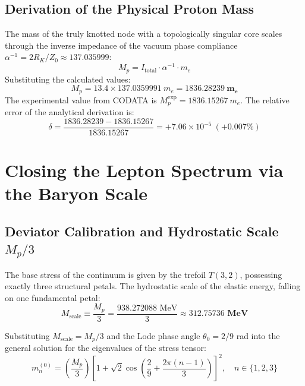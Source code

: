 \documentclass[12pt,a4paper]{article}
\begin{document}
	\subsection{Derivation of the Physical Proton Mass}
	The mass of the truly knotted node with a topologically singular core scales through the inverse impedance of the vacuum phase compliance $\alpha^{-1} = 2R_K / Z_0 \approx 137.035999$:
	\begin{equation}
		M_p = I_{\text{total}} \cdot \alpha^{-1} \cdot m_e
	\end{equation}
	Substituting the calculated values:
	\begin{equation}
		M_p = 13.4 \times 137.0359991 \ m_e = \mathbf{1836.28239 \ m_e}
	\end{equation}
	The experimental value from CODATA is $M_p^{\text{exp}} = 1836.15267 \ m_e$. 
	The relative error of the analytical derivation is:
	\begin{equation}
		\delta = \frac{1836.28239 - 1836.15267}{1836.15267} = +7.06 \times 10^{-5} \ (+0.007\%)
	\end{equation}
	
	\section{Closing the Lepton Spectrum via the Baryon Scale}
	
	\subsection{Deviator Calibration and Hydrostatic Scale $M_p/3$}
	The base stress of the continuum is given by the trefoil $T(3,2)$, possessing exactly three structural petals. The hydrostatic scale of the elastic energy, falling on one fundamental petal:
	\begin{equation}
		M_{\text{scale}} \equiv \frac{M_p}{3} = \frac{938.272088 \text{ MeV}}{3} \approx \mathbf{312.75736 \text{ MeV}}
	\end{equation}
	
	Substituting $M_{\text{scale}} = M_p/3$ and the Lode phase angle $\theta_0 = 2/9$ rad into the general solution for the eigenvalues of the stress tensor:
	\begin{equation}
		m_n^{(0)} = \left( \frac{M_p}{3} \right) \left[ 1 + \sqrt{2} \cos\left( \frac{2}{9} + \frac{2\pi(n-1)}{3} \right) \right]^2, \quad n \in \{1, 2, 3\}
	\end{equation}
	
\end{document}
